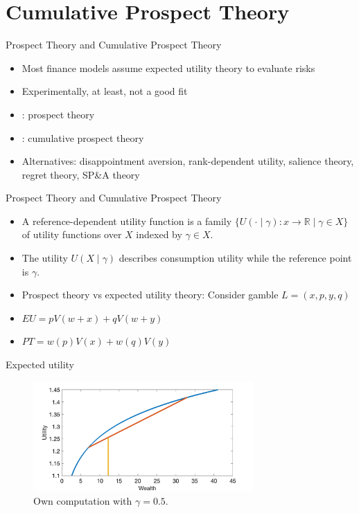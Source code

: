 \documentclass[11pt, aspectratio=169]{beamer}
\begin{document}
\section{Cumulative Prospect Theory}
\begin{frame}{Prospect Theory and Cumulative Prospect Theory}
    \begin{itemize}
        \item Most finance models assume expected utility theory to evaluate risks\bigskip
        \item Experimentally, at least, not a good fit\bigskip
        \item \citet{KahnemanTversky1979}: prospect theory\bigskip
        \item \citet{TverskyKahneman1992}: cumulative prospect theory\bigskip
        \item Alternatives: disappointment aversion, rank-dependent utility, salience theory, regret theory, SP\&A theory\bigskip
    \end{itemize}
\end{frame}


\begin{frame}{Prospect Theory and Cumulative Prospect Theory}
    \begin{itemize}
        \item A reference-dependent utility function is a family $\{U(\cdot \mid \gamma):x \longrightarrow \mathbb{R} \mid \gamma \in X\}$  of utility functions over $X$ indexed by $\gamma \in X$.\bigskip
        \item The utility $U(X \mid \gamma)$ describes consumption utility while the reference point is $\gamma$.\bigskip
        \item Prospect theory vs expected utility theory: Consider gamble $L = (x, p, y, q)$\bigskip
        \item $EU = p V(w + x) + q V(w + y)$\bigskip
        \item $PT = w(p) V(x) + w(q) V(y)$\bigskip
\end{itemize}
\end{frame}


\begin{frame}{Expected utility}
    \begin{figure}
\centering
\includegraphics[width= 0.75\textwidth]{expected_utility}
\caption{Own computation with $\gamma =0.5$.}
    \end{figure}
\end{frame}
\end{document}
